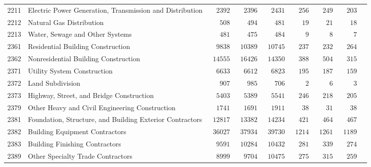 \documentclass[9pt, oneside]{article}   	%
\begin{document}
\begin{longtable}{lp{3 in}ccccccc}
2211  & Electric Power Generation, Transmission and Distribution & $\phantom{00}2392$ & $\phantom{00}2396$ & $\phantom{00}2431$ & $\phantom{00}256$ & $\phantom{00}249$ & $\phantom{00}203$ \\
2212  & Natural Gas Distribution & $\phantom{000}508$ & $\phantom{000}494$ & $\phantom{000}481$ & $\phantom{000}19$ & $\phantom{000}21$ & $\phantom{000}18$ \\
2213  & Water, Sewage and Other Systems & $\phantom{000}481$ & $\phantom{000}475$ & $\phantom{000}484$ & $\phantom{0000}9$ & $\phantom{0000}8$ & $\phantom{0000}7$ \\
2361  & Residential Building Construction & $\phantom{00}9838$ & $\phantom{0}10389$ & $\phantom{0}10745$ & $\phantom{00}237$ & $\phantom{00}232$ & $\phantom{00}264$ \\
2362  & Nonresidential Building Construction & $\phantom{0}14555$ & $\phantom{0}16426$ & $\phantom{0}14350$ & $\phantom{00}388$ & $\phantom{00}504$ & $\phantom{00}315$ \\
2371  & Utility System Construction & $\phantom{00}6633$ & $\phantom{00}6612$ & $\phantom{00}6823$ & $\phantom{00}195$ & $\phantom{00}187$ & $\phantom{00}159$ \\
2372  & Land Subdivision & $\phantom{000}907$ & $\phantom{000}985$ & $\phantom{000}706$ & $\phantom{0000}2$ & $\phantom{0000}6$ & $\phantom{0000}3$ \\
2373  & Highway, Street, and Bridge Construction & $\phantom{00}5403$ & $\phantom{00}5389$ & $\phantom{00}5541$ & $\phantom{00}246$ & $\phantom{00}218$ & $\phantom{00}205$ \\
2379  & Other Heavy and Civil Engineering Construction & $\phantom{00}1741$ & $\phantom{00}1691$ & $\phantom{00}1911$ & $\phantom{000}38$ & $\phantom{000}31$ & $\phantom{000}38$ \\
2381  & Foundation, Structure, and Building Exterior Contractors & $\phantom{0}12817$ & $\phantom{0}13382$ & $\phantom{0}14234$ & $\phantom{00}421$ & $\phantom{00}464$ & $\phantom{00}467$ \\
2382  & Building Equipment Contractors & $\phantom{0}36027$ & $\phantom{0}37934$ & $\phantom{0}39730$ & $\phantom{0}1214$ & $\phantom{0}1261$ & $\phantom{0}1189$ \\
2383  & Building Finishing Contractors & $\phantom{00}9591$ & $\phantom{0}10284$ & $\phantom{0}10432$ & $\phantom{00}281$ & $\phantom{00}339$ & $\phantom{00}274$ \\
2389  & Other Specialty Trade Contractors & $\phantom{00}8999$ & $\phantom{00}9704$ & $\phantom{0}10475$ & $\phantom{00}275$ & $\phantom{00}315$ & $\phantom{00}259$ \\


\end{longtable}
\end{document}
